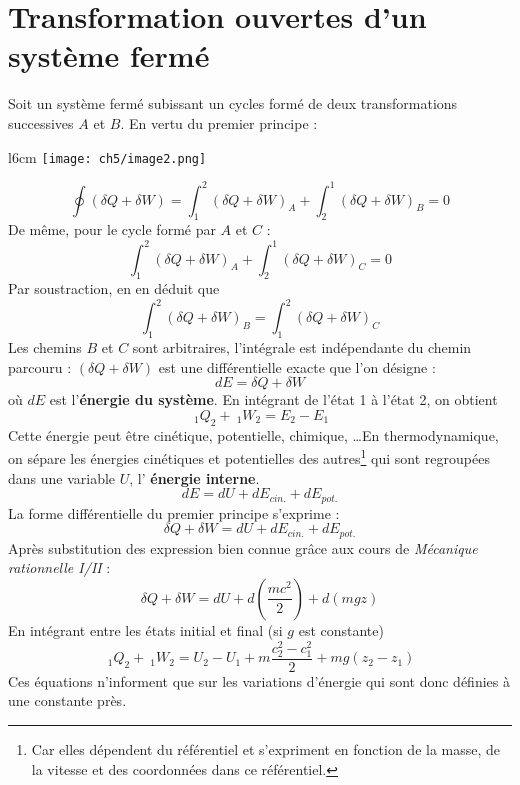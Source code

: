 \section{Transformation ouvertes d'un système fermé}
Soit un système fermé subissant un cycles formé de deux transformations 
successives $A$ et $B$. En vertu du premier principe :\\
\begin{wrapfigure}[9]{l}{6cm}
	\vspace{-7mm}
	\texttt{[image: ch5/image2.png]}
\end{wrapfigure}
\vspace{-1cm}
\begin{equation}
	\oint (\delta Q + \delta W) = \int_1^2 (\delta Q + \delta W)_A + \int_2^1 
	(\delta Q + \delta W)_B = 0
\end{equation}
De même, pour le cycle formé par $A$ et $C$ :
\begin{equation}
	\int_1^2 (\delta Q + \delta W)_A + \int_2^1 (\delta Q + \delta W)_C = 0
\end{equation}
Par soustraction, en en déduit que
\begin{equation}
	\int_1^2 (\delta Q + \delta W)_B = \int_1^2 (\delta Q + \delta W)_C
\end{equation}
Les chemins $B$ et $C$ sont arbitraires, l'intégrale est indépendante 
du chemin parcouru : $(\delta Q + \delta W)$ est une différentielle 
exacte que l'on désigne :
\begin{equation}
	dE = \delta Q + \delta W
\end{equation}
où $dE$ est l'\textbf{énergie du système}. En intégrant de l'état 1 à 
l'état 2, on obtient
\begin{equation}
	\ _1Q_2 + \ _1W_2 = E_2-E_1
\end{equation}
Cette énergie peut être cinétique, potentielle, chimique, \dots En 
thermodynamique, on sépare les énergies cinétiques et potentielles 
des autres\footnote{Car elles dépendent du référentiel et s'expriment 
	en fonction de la masse, de la vitesse et des coordonnées dans ce 
	référentiel.} qui sont regroupées dans une variable $U$, l'\textbf{%
énergie interne}.
\begin{equation}
	dE = dU + dE_{cin.} + dE_{pot.}
\end{equation}
La forme différentielle du premier principe s'exprime :
\begin{equation}
	\delta Q + \delta W = dU + dE_{cin.} + dE_{pot.}
\end{equation}
Après substitution des expression bien connue grâce aux cours de \textit{%
Mécanique rationnelle I/II} : 
\begin{equation}
	\delta Q + \delta W = dU + d\left(\frac{mc^2}{2}\right) + d(mgz)
\end{equation}
En intégrant entre les états initial et final (si $g$ est constante)
\begin{equation}
	\ _1Q_2 + \ _1W_2 = U_2 - U_1 + m\frac{c_2^2-c_1^2}{2}+mg(z_2-z_1)
\end{equation}
Ces équations n'informent que sur les variations d'énergie qui sont 
donc définies à une constante près.

